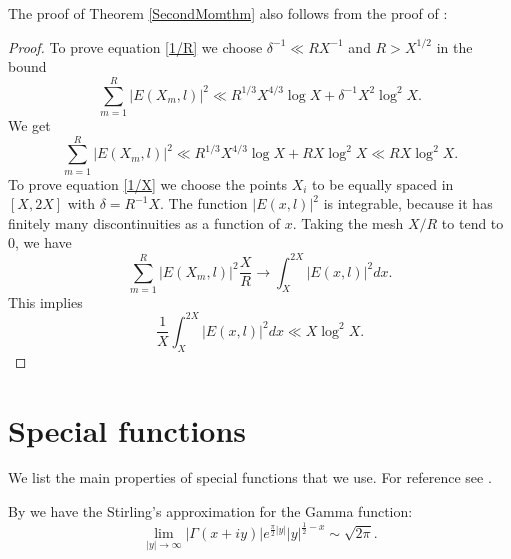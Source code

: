 \documentclass[a4paper,11pt]{amsart}
\theoremstyle{definition}
\begin{document}
The proof of Theorem \ref{SecondMomthm} also follows from the proof of \cite[Theorem 5.4]{CP}:
\begin{proof}
To prove equation \eqref{1/R} we choose $\delta^{-1} \ll RX^{-1}$ and $R>X^{1/2}$ in the bound 
$$\sum_{m=1}^R|E(X_m,l)|^2\ll R^{1/3}X^{4/3}\log X+\delta^{-1}X^2\log^2 X.$$
We get
$$\sum_{m=1}^R|E(X_m,l)|^2\ll R^{1/3}X^{4/3}\log X+RX\log^2 X\ll RX\log^2 X.$$
To prove equation \eqref{1/X} we choose the points $X_i$ to be equally spaced in $[X,2X]$ with $\delta=R^{-1}X$. The function $|E(x,l)|^2$ is integrable, because it has finitely many discontinuities as a function of $x$. Taking the mesh $X/R$ to tend to $0$, we have 
$$\sum_{m=1}^R|E(X_m,l)|^2\frac{X}{R} \to \int_X^{2X}|E(x,l)|^2dx.$$
This implies
$$\frac{1}{X}\int_X^{2X}|E(x,l)|^2dx \ll X\log^2 X.$$
\end{proof}

\appendix
\section{Special functions}

 We list the main properties of special functions that we use. For reference see \cite{gradshteyn2007}.

By \cite[eq. 8.328.1]{gradshteyn2007} we have the Stirling's approximation for the Gamma function:
\begin{equation}\label{Stir}
    \lim_{|y|\to \infty}|\Gamma(x+iy)| e^{\frac{\pi}{2}|y|}|y|^{\frac{1}{2}-x}\sim \sqrt{2\pi}.
\end{equation}
\end{document}
